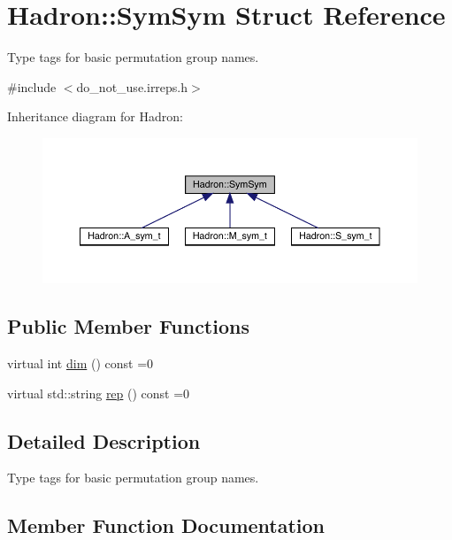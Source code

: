 \hypertarget{structHadron_1_1SymSym}{}\section{Hadron\+:\+:Sym\+Sym Struct Reference}
\label{structHadron_1_1SymSym}


Type tags for basic permutation group names.  




{\ttfamily \#include $<$do\+\_\+not\+\_\+use.\+irreps.\+h$>$}



Inheritance diagram for Hadron\+:\nopagebreak
\begin{figure}[H]
\begin{center}
\leavevmode
\includegraphics[width=350pt]{d7/db8/structHadron_1_1SymSym__inherit__graph}
\end{center}
\end{figure}
\subsection*{Public Member Functions}
\begin{DoxyCompactItemize}
\item 
virtual int \mbox{\hyperlink{structHadron_1_1SymSym_ae57780f41b9f6c03c6056eed3677bd48}{dim}} () const =0
\item 
virtual std\+::string \mbox{\hyperlink{structHadron_1_1SymSym_aa6e588740862036933a9efe085a5e5e5}{rep}} () const =0
\end{DoxyCompactItemize}


\subsection{Detailed Description}
Type tags for basic permutation group names. 

\subsection{Member Function Documentation}
\mbox{\label{structHadron_1_1SymSym_ae57780f41b9f6c03c6056eed3677bd48}} 

